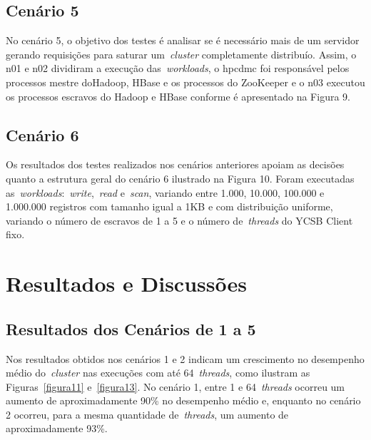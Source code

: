 \documentclass[12pt]{article}
\begin{document}
\subsection{Cenário 5}
No cenário 5, o objetivo dos testes é analisar se é necessário mais de um servidor gerando
requisições para saturar um~\emph{cluster}  completamente distribuío. Assim, o n01 e n02 dividiram a execução das~\emph{workloads}, o hpcdmc foi responsável pelos processos mestre doHadoop, HBase e os processos do ZooKeeper e o n03 executou os processos escravos do Hadoop e HBase conforme é apresentado na Figura 9.

\subsection{Cenário 6}
Os resultados dos testes realizados nos cenários anteriores apoiam as decisões quanto a estrutura geral do cenário 6 ilustrado na Figura 10. Foram executadas as~\emph{workloads}:~\emph{write},~\emph{read} e~\emph{scan}, variando entre 1.000, 10.000, 100.000 e 1.000.000 registros com tamanho igual a 1KB e com distribuição uniforme, variando o número de escravos de 1 a 5 e o número de~\emph{threads} do YCSB Client fixo.

\section{Resultados e Discussões}
\label{section:resultados}

\subsection{Resultados dos Cenários de 1 a 5}

Nos resultados obtidos nos cenários 1 e 2 indicam um crescimento no desempenho médio do~\emph{cluster} nas execuções com até 64~\emph{threads}, como ilustram as Figuras~\ref{figura11} e~\ref{figura13}.
No cenário 1, entre 1 e 64~\emph{threads} ocorreu um aumento de aproximadamente 90\% no desempenho médio e, enquanto no cenário 2 ocorreu, para a mesma quantidade de~\emph{threads}, um aumento de aproximadamente 93\%.
\end{document}
